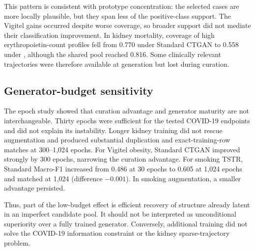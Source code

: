 This pattern is consistent with prototype concentration: the selected cases are more locally plausible, but they span less of the positive-class support. The Vigitel gains occurred despite worse coverage, so broader support did not mediate their classification improvement. In kidney mortality, coverage of high erythropoietin-count profiles fell from 0.770 under Standard CTGAN to 0.558 under \sepa{}, although the shared pool reached 0.816. Some clinically relevant trajectories were therefore available at generation but lost during curation.

\subsection{Generator-budget sensitivity}

The epoch study showed that curation advantage and generator maturity are not interchangeable. Thirty epochs were sufficient for the tested COVID-19 endpoints and did not explain its instability. Longer kidney training did not rescue augmentation and produced substantial duplication and exact-training-row matches at 300--1,024 epochs. For Vigitel obesity, Standard CTGAN improved strongly by 300 epochs, narrowing the curation advantage. For smoking TSTR, Standard Macro-F1 increased from 0.486 at 30 epochs to 0.605 at 1,024 epochs and matched \sepa{} at 1,024 (difference $-0.001$). In smoking augmentation, a smaller \sepa{} advantage persisted.

Thus, part of the low-budget effect is efficient recovery of structure already latent in an imperfect candidate pool. It should not be interpreted as unconditional superiority over a fully trained generator. Conversely, additional training did not solve the COVID-19 information constraint or the kidney sparse-trajectory problem.
